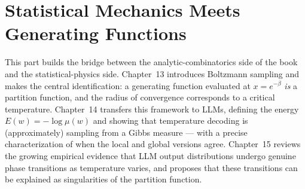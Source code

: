 \part{Statistical Mechanics Meets Generating Functions}

This part builds the bridge between the analytic-combinatorics side of the book and the statistical-physics side. Chapter~13 introduces Boltzmann sampling and makes the central identification: a generating function evaluated at $x = e^{-\beta}$ \emph{is} a partition function, and the radius of convergence corresponds to a critical temperature. Chapter~14 transfers this framework to LLMs, defining the energy $E(w) = -\log\mu(w)$ and showing that temperature decoding is (approximately) sampling from a Gibbs measure --- with a precise characterization of when the local and global versions agree. Chapter~15 reviews the growing empirical evidence that LLM output distributions undergo genuine phase transitions as temperature varies, and proposes that these transitions can be explained as singularities of the partition function.




